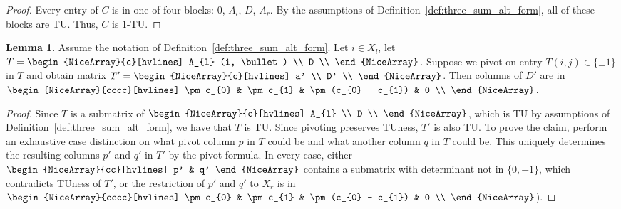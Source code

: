\documentclass{article}
\theoremstyle{definition}
\newtheorem{lemma}[theorem]{Lemma}
\begin{document}
\begin{proof}
    Every entry of $C$ is in one of four blocks: $0$, $A_{l}$, $D$, $A_{r}$. By the assumptions of Definition~\ref{def:three_sum_alt_form}, all of these blocks are TU. Thus, $C$ is $1$-TU.
\end{proof}

\begin{lemma}\label{lem:three_sum_alt_form_pivot}
    Assume the notation of Definition~\ref{def:three_sum_alt_form}. Let $i \in X_{l}$, let $T = \begin{NiceArray}{c}[hvlines] A_{l} (i, \bullet) \\ D \\ \end{NiceArray}$. Suppose we pivot on entry $T (i, j) \in \{\pm 1\}$ in $T$ and obtain matrix $T' = \begin{NiceArray}{c}[hvlines] a' \\ D' \\ \end{NiceArray}$. Then columns of $D'$ are in $\begin{NiceArray}{cccc}[hvlines] \pm c_{0} & \pm c_{1} & \pm (c_{0} - c_{1}) & 0 \\ \end{NiceArray}$.
\end{lemma}

\begin{proof}
    Since $T$ is a submatrix of $\begin{NiceArray}{c}[hvlines] A_{l} \\ D \\ \end{NiceArray}$, which is TU by assumptions of Definition~\ref{def:three_sum_alt_form}, we have that $T$ is TU. Since pivoting preserves TUness, $T'$ is also TU. To prove the claim, perform an exhaustive case distinction on what pivot column $p$ in $T$ could be and what another column $q$ in $T$ could be. This uniquely determines the resulting columns $p'$ and $q'$ in $T'$ by the pivot formula. In every case, either $\begin{NiceArray}{cc}[hvlines] p' & q' \end{NiceArray}$ contains a submatrix with determinant not in $\{0, \pm 1\}$, which contradicts TUness of $T'$, or the restriction of $p'$ and $q'$ to $X_{r}$ is in $\begin{NiceArray}{cccc}[hvlines] \pm c_{0} & \pm c_{1} & \pm (c_{0} - c_{1}) & 0 \\ \end{NiceArray}$).
\end{proof}
\end{document}
